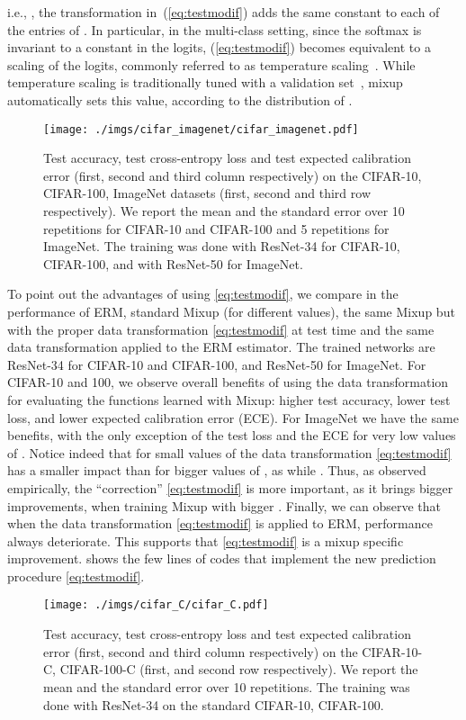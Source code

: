 \documentclass[twoside,11pt]{article}
\begin{document}
i.e., , the transformation in~(\ref{eq:testmodif}) adds the same 
constant to each of the  entries of . In particular, in the multi-class setting, 
since the softmax is invariant to a constant in the logits, (\ref{eq:testmodif}) becomes equivalent 
to a scaling of the logits, commonly referred to as temperature scaling~\citep{guo2017calibration}. 
While temperature scaling is traditionally tuned with a validation set~\citep{guo2017calibration}, 
mixup automatically sets this value, according to the distribution of .
\begin{figure}[ht]
    \texttt{[image: ./imgs/cifar\_imagenet/cifar\_imagenet.pdf]}
    \caption{\small{Test accuracy, test cross-entropy loss and test expected calibration error (first, second and third column respectively) on the CIFAR-10, CIFAR-100, ImageNet datasets (first, second and third row respectively). 
    We report the mean and the standard error over 10 repetitions for CIFAR-10 and CIFAR-100 and 5 repetitions for ImageNet. 
    The training was done with ResNet-34 for CIFAR-10, CIFAR-100, and with ResNet-50 for ImageNet.}
    }\label{fig:data_transf_mixup}
\end{figure} 
To point out the advantages of using \eqref{eq:testmodif}, we compare in  the performance
of ERM, standard Mixup (for different  values), the same Mixup but with the proper 
data transformation \eqref{eq:testmodif} at test time and the same data transformation applied to the ERM estimator. 
The trained networks are ResNet-34 for CIFAR-10 and CIFAR-100, and ResNet-50 for ImageNet.
For CIFAR-10 and 100, we observe overall benefits of using the data transformation for evaluating the functions learned with Mixup:
higher test accuracy, lower test loss, and lower expected calibration error (ECE). For ImageNet we have the same benefits, 
with the only exception of the test loss and the ECE for very low values of . 
Notice indeed that for small values of  the data transformation \eqref{eq:testmodif} has a smaller impact
than for bigger values of , as  
while . Thus, as observed empirically, the 
``correction'' \eqref{eq:testmodif} is more important, as it brings bigger improvements, 
when training Mixup with bigger . Finally, we can observe that when 
the data transformation \eqref{eq:testmodif} is applied to ERM, performance always deteriorate.
This supports that \eqref{eq:testmodif} is a mixup specific improvement. 
 shows the few lines of codes that implement the new prediction procedure \eqref{eq:testmodif}.
\begin{figure}[ht]
    \texttt{[image: ./imgs/cifar\_C/cifar\_C.pdf]}
    \caption{\small{Test accuracy, test cross-entropy loss and test expected calibration error (first, second and third column respectively) 
    on the CIFAR-10-C, CIFAR-100-C (first, and second row respectively). 
    We report the mean and the standard error over 10 repetitions.
    The training was done with ResNet-34 on the standard CIFAR-10, CIFAR-100.}
    }\label{fig:data_transf_mixup-OOD}
\end{figure}
\end{document}
